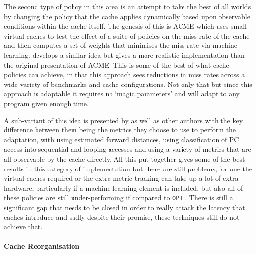 The second type of policy in this area is an attempt to take the best of all worlds by changing the policy that the cache applies dynamically based upon observable conditions within the cache itself. The genesis of this is ACME \cite{ariACMEAdaptiveCaching2002, gramacyAdaptiveCachingRefetching2003, riaz-ud-dinAcmeDBAdaptiveCaching2006} which uses small virtual caches to test the effect of a suite of policies on the miss rate of the cache and then computes a set of weights that minimises the miss rate via machine learning. \citet{subramanianAdaptiveCachesEffective2006} develops a similar idea but gives a more realistic implementation than the original presentation of ACME. This is some of the best of what cache policies can achieve, in that this approach sees reductions in miss rates across a wide variety of benchmarks and cache configurations. Not only that but since this approach is adaptable it requires no `magic parameters' and will adapt to any program given enough time. 

A sub-variant of this idea is presented by \citet{jongmoochoiDesignImplementationPerformance2002} as well as other authors \cite{smaragdakisGeneralAdaptiveReplacement2004, aguilarGeneralAdaptiveCache2004, aguilarCoherenceReplacementProtocolWeb2006, changAdaptiveBufferCache2016, changPARCNovelOS2018} with the key difference between them being the metrics they choose to use to perform the adaptation, with \citeauthor{jongmoochoiDesignImplementationPerformance2002} using estimated forward distances, \citeauthor{changAdaptiveBufferCache2016} using classification of PC access into sequential and looping accesses and  \citeauthor{aguilarGeneralAdaptiveCache2004} using a variety of metrics that are all observable by the cache directly. All this put together gives some of the best results in this category of implementation but there are still problems, for one the virtual caches required or the extra metric tracking can take up a lot of extra hardware, particularly if a machine learning element is included, but also all of these policies are still under-performing if compared to \texttt{OPT} \citet{beladyStudyReplacementAlgorithms1966}. There is still a significant gap that needs to be closed in order to really attack the latency that caches introduce and sadly despite their promise, these techniques still do not achieve that.

\paragraph{Cache Reorganisation}

